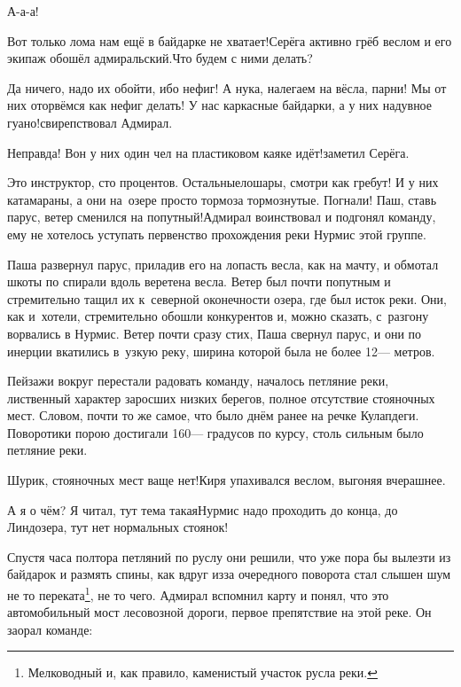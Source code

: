 \diagdash А-а-а!

\diagdash Вот только лома нам ещё в байдарке не хватает!\mdash Серёга активно грёб веслом и его экипаж обошёл адмиральский.\mdash Что будем с ними делать?

\diagdash Да ничего, надо их обойти, ибо нефиг! А ну\sdash ка, налегаем на вёсла, парни! Мы от них оторвёмся как нефиг делать! У нас каркасные байдарки, а у них надувное гуано!\mdash свирепствовал Адмирал.

\diagdash Неправда! Вон у них один чел на пластиковом каяке идёт!\mdash заметил Серёга.

\diagdash Это инструктор, сто процентов. Остальные\mdash лошары, смотри как гребут! И у них катамараны, а они на~озере просто тормоза тормознутые. Погнали! Паш, ставь парус, ветер сменился на попутный!\mdash Адмирал воинствовал и подгонял команду, ему не хотелось уступать первенство прохождения реки Нурмис этой группе.

Паша развернул парус, приладив его на лопасть весла, как на мачту, и обмотал шкоты по спирали вдоль веретена весла. Ветер был почти попутным и стремительно тащил их к~северной оконечности озера, где был исток реки. Они, как и~хотели, стремительно обошли конкурентов и, можно сказать, с~разгону ворвались в Нурмис. Ветер почти сразу стих, Паша свернул парус, и они по инерции вкатились в~узкую реку, ширина которой была не более 12\thinspace\nobreakdash--- метров.


Пейзажи вокруг перестали радовать команду, началось петляние реки, лиственный характер заросших низких берегов, полное отсутствие стояночных мест. Словом, почти то же самое, что было днём ранее на речке Кулапдеги. Поворотики порою достигали 160\thinspace\nobreakdash--- градусов по курсу, столь сильным было петляние реки.

\diagdash Шурик, стояночных мест ваще нет!\mdash Киря упахивался веслом, выгоняя вчерашнее.

\diagdash А я о чём? Я читал, тут тема такая\mdash Нурмис надо проходить до конца, до Линдозера, тут нет нормальных стоянок!

\renewcommand*{\thefootnote}{\fnsymbol{footnote}}
\setcounter{footnote}{0}
Спустя часа полтора петляний по руслу они решили, что уже пора бы вылезти из байдарок и размять спины, как вдруг из\sdash за очередного поворота стал слышен шум не то переката\footnote{Мелководный и, как правило, каменистый участок русла реки.}, не то чего. Адмирал вспомнил карту и понял, что это автомобильный мост лесовозной дороги, первое препятствие на этой реке. Он заорал команде:

